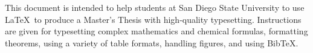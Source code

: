 

This document is intended to help students at San Diego State
University to use  \LaTeX\ to produce a Master's Thesis with
high-quality typesetting. Instructions are given for typesetting
complex mathematics and chemical formulas, formatting theorems, using a
variety of table formats, handling figures, and using {\sc Bib}\TeX.  



